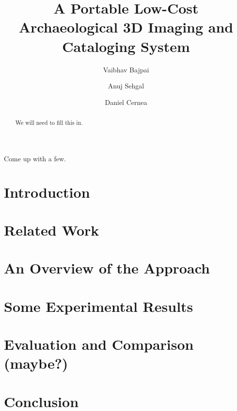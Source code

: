\documentclass[english]{llncs}
\newenvironment{keywords}{
       \list{}{\advance\topsep by0.35cm\relax\small
       \leftmargin=1cm
       \labelwidth=0.35cm
       \listparindent=0.35cm
       \itemindent\listparindent
       \rightmargin\leftmargin}
			 \item[\hskip\labelsep\bfseries Keywords:]}
     {\endlist}
\begin{document}
\frontmatter 
	\pagestyle{headings} 
\mainmatter 

\title{A Portable Low-Cost Archaeological 3D Imaging and Cataloging System}

\author{Vaibhav Bajpai\and Anuj Sehgal\and Daniel Cernea}



\maketitle

\begin{abstract}
We will need to fill this in.
\end{abstract}

\begin{keywords}
Come up with a few.
\end{keywords}

\section{Introduction}
\label{section:introduction}


\section{Related Work}
\label{section:relatedwork}


\section{An Overview of the Approach}
\label{section:approach}


\section{Some Experimental Results}
\label{section:results}


\section{Evaluation and Comparison (maybe?)}
\label{section:evaluation-comparison}


\section{Conclusion}
\label{section:conclusion}

\end{document}
